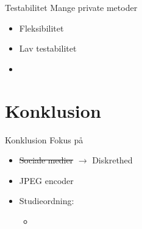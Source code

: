 \begin{frame}[fragile]{Testabilitet}
    Mange private metoder
    \begin{itemize}
        \item Fleksibilitet %
        \item Lav testabilitet
    \end{itemize}
    \begin{itemize}
        \item[]
    \end{itemize}
\end{frame}

\section{Konklusion}
\begin{frame}{Konklusion}
    Fokus på
    \begin{itemize}
        \item{\sout{Sociale medier} $\rightarrow$ Diskrethed}
        \item JPEG encoder
        \item Studieordning:
        \begin{itemize}
            \item[]
        \end{itemize}
    \end{itemize}
\end{frame}
